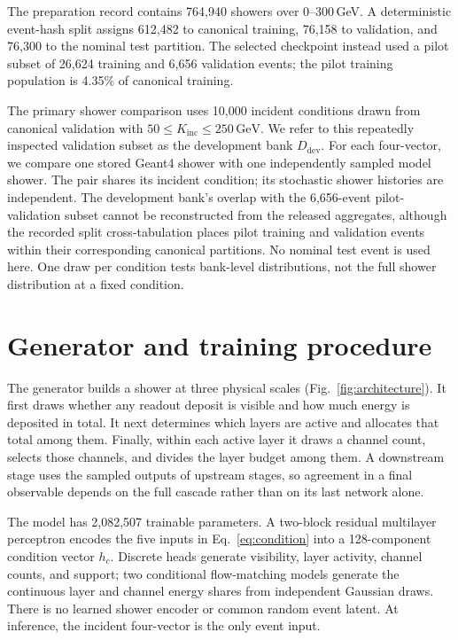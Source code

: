 \documentclass[11pt]{article}
\newcommand{\GeV}{\,\mathrm{GeV}}
\newcommand{\Kinc}{K_{\mathrm{inc}}}
\newcommand{\Ddev}{D_{\mathrm{dev}}}
\begin{document}
The preparation record contains 764,940 showers over 0--300\,GeV. A deterministic event-hash split assigns 612,482 to canonical training, 76,158 to validation, and 76,300 to the nominal test partition. The selected checkpoint instead used a pilot subset of 26,624 training and 6,656 validation events; the pilot training population is 4.35\% of canonical training.

The primary shower comparison uses 10,000 incident conditions drawn from canonical validation with $50\leq\Kinc\leq250\GeV$. We refer to this repeatedly inspected validation subset as the development bank $\Ddev$. For each four-vector, we compare one stored Geant4 shower with one independently sampled model shower. The pair shares its incident condition; its stochastic shower histories are independent. The development bank's overlap with the 6,656-event pilot-validation subset cannot be reconstructed from the released aggregates, although the recorded split cross-tabulation places pilot training and validation events within their corresponding canonical partitions. No nominal test event is used here. One draw per condition tests bank-level distributions, not the full shower distribution at a fixed condition.

\section{Generator and training procedure}
\label{sec:model}

The generator builds a shower at three physical scales (Fig.~\ref{fig:architecture}). It first draws whether any readout deposit is visible and how much energy is deposited in total. It next determines which layers are active and allocates that total among them. Finally, within each active layer it draws a channel count, selects those channels, and divides the layer budget among them. A downstream stage uses the sampled outputs of upstream stages, so agreement in a final observable depends on the full cascade rather than on its last network alone.

The model has 2,082,507 trainable parameters. A two-block residual multilayer perceptron encodes the five inputs in Eq.~\eqref{eq:condition} into a 128-component condition vector $h_c$. Discrete heads generate visibility, layer activity, channel counts, and support; two conditional flow-matching models generate the continuous layer and channel energy shares from independent Gaussian draws. There is no learned shower encoder or common random event latent. At inference, the incident four-vector is the only event input.
\end{document}
